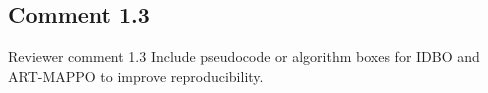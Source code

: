 \documentclass[11pt]{article}
\begin{document}

\subsection*{Comment 1.3 }

\begin{reviewercomment}{Reviewer comment 1.3}
Include pseudocode or algorithm boxes for IDBO and ART-MAPPO to improve
reproducibility.
\end{reviewercomment}
\end{document}
